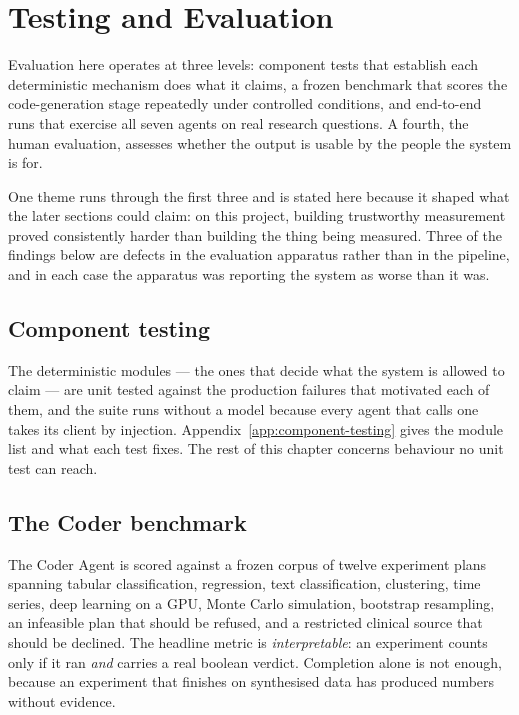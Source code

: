 \chapter{Testing and Evaluation}
\label{ch:evaluation}


Evaluation here operates at three levels: component tests that establish each
deterministic mechanism does what it claims, a frozen benchmark that scores the
code-generation stage repeatedly under controlled conditions, and end-to-end runs
that exercise all seven agents on real research questions. A fourth, the human
evaluation, assesses whether the output is usable by the people the system is
for.

One theme runs through the first three and is stated here because it shaped what
the later sections could claim: on this project, building trustworthy measurement
proved consistently harder than building the thing being measured. Three of the
findings below are defects in the evaluation apparatus rather than in the
pipeline, and in each case the apparatus was reporting the system as worse than
it was.

\section{Component testing}
\label{sec:component-testing}

The deterministic modules --- the ones that decide what the system is allowed to
claim --- are unit tested against the production failures that motivated each of
them, and the suite runs without a model because every agent that calls one takes
its client by injection. Appendix~\ref{app:component-testing} gives the module
list and what each test fixes. The rest of this chapter concerns behaviour no unit
test can reach.

\section{The Coder benchmark}
\label{sec:benchmark}

The Coder Agent is scored against a frozen corpus of twelve experiment plans
spanning tabular classification, regression, text classification, clustering,
time series, deep learning on a GPU, Monte Carlo simulation, bootstrap
resampling, an infeasible plan that should be refused, and a restricted clinical
source that should be declined. The headline metric is \emph{interpretable}: an
experiment counts only if it ran \emph{and} carries a real boolean verdict.
Completion alone is not enough, because an experiment that finishes on
synthesised data has produced numbers without evidence.

